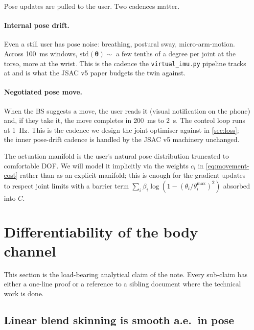 \documentclass[11pt,a4paper]{article}
\theoremstyle{definition}
\newcommand{\thetab}{\bm{\theta}}
\begin{document}
Pose updates are pulled to the user.  Two cadences matter.

\paragraph{Internal pose drift.}  Even a still user has pose noise:
breathing, postural sway, micro-arm-motion.  Across \SI{100}{ms}
windows, $\mathrm{std}(\thetab)\sim$ a few tenths of a degree per
joint at the torso, more at the wrist.  This is the cadence the
\texttt{virtual\_imu.py} pipeline tracks at and is what the JSAC v5
paper budgets the twin against.

\paragraph{Negotiated pose move.}  When the BS suggests a move, the
user reads it (visual notification on the phone) and, if they take
it, the move completes in \SI{200}{ms} to \SI{2}{s}.  The control
loop runs at \SI{1}{Hz}.  This is the cadence we design the joint
optimiser against in \cref{sec:loss}; the inner pose-drift cadence
is handled by the JSAC v5 machinery unchanged.

The actuation manifold is the user's natural pose distribution
truncated to comfortable DOF.  We will model it implicitly via the
weights $c_i$ in \eqref{eq:movement-cost} rather than as an explicit
manifold; this is enough for the gradient updates to respect joint
limits with a barrier term $\sum_i\beta_i\log(1-(\theta_i/\theta_i^{\max})^2)$
absorbed into $C$.

\section{Differentiability of the body channel}\label{sec:diff}

This section is the load-bearing analytical claim of the note.  Every
sub-claim has either a one-line proof or a reference to a sibling
document where the technical work is done.

\subsection{Linear blend skinning is smooth a.e.\ in pose}
\end{document}

